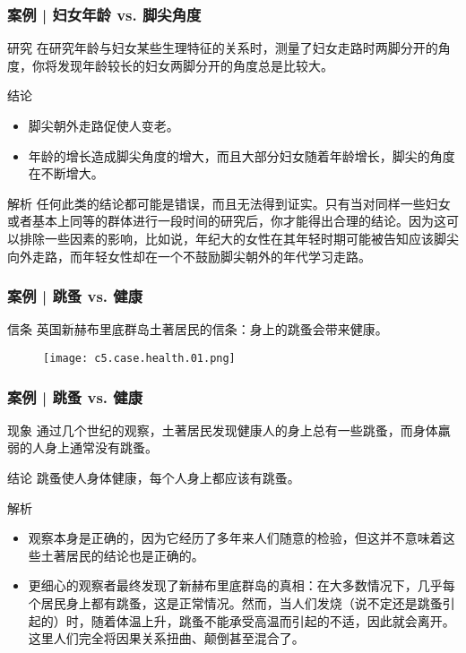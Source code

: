\begin{frame}
  \frametitle{案例 | 妇女年龄 vs. 脚尖角度}
  \begin{block}{研究}
    在研究年龄与妇女某些生理特征的关系时，测量了妇女走路时两脚分开的角度，你将发现年龄较长的妇女两脚分开的角度总是比较大。
  \end{block}
  \pause
  \begin{block}{结论}
    \begin{itemize}
      \item 脚尖朝外走路促使人变老。
      \item 年龄的增长造成脚尖角度的增大，而且大部分妇女随着年龄增长，脚尖的角度在不断增大。
    \end{itemize}
  \end{block}
  \pause \pause \pause \pause
  \begin{block}{解析}
任何此类的结论都可能是错误，而且无法得到证实。只有当对同样一些妇女或者基本上同等的群体进行一段时间的研究后，你才能得出合理的结论。因为这可以排除一些因素的影响，比如说，年纪大的女性在其年轻时期可能被告知应该脚尖向外走路，而年轻女性却在一个不鼓励脚尖朝外的年代学习走路。
  \end{block}
\end{frame}

\begin{frame}
  \frametitle{案例 | 跳蚤 vs. 健康}
  \begin{block}{信条}
    英国新赫布里底群岛土著居民的信条：身上的跳蚤会带来健康。
  \end{block}
  \begin{figure}
    \centering
    \texttt{[image: c5.case.health.01.png]}
  \end{figure}
\end{frame}

\begin{frame}
  \frametitle{案例 | 跳蚤 vs. 健康}
  \begin{block}{现象}
    通过几个世纪的观察，土著居民发现健康人的身上总有一些跳蚤，而身体羸弱的人身上通常没有跳蚤。
  \end{block}
  \pause
  \begin{block}{结论}
    跳蚤使人身体健康，每个人身上都应该有跳蚤。
  \end{block}
  \pause \pause \pause \pause
  \begin{block}{解析}
    \begin{itemize}
      \item 观察本身是正确的，因为它经历了多年来人们随意的检验，但这并不意味着这些土著居民的结论也是正确的。
      \item 更细心的观察者最终发现了新赫布里底群岛的真相：在大多数情况下，几乎每个居民身上都有跳蚤，这是正常情况。然而，当人们发烧（说不定还是跳蚤引起的）时，随着体温上升，跳蚤不能承受高温而引起的不适，因此就会离开。这里人们完全将因果关系扭曲、颠倒甚至混合了。
    \end{itemize}
  \end{block}
\end{frame}

